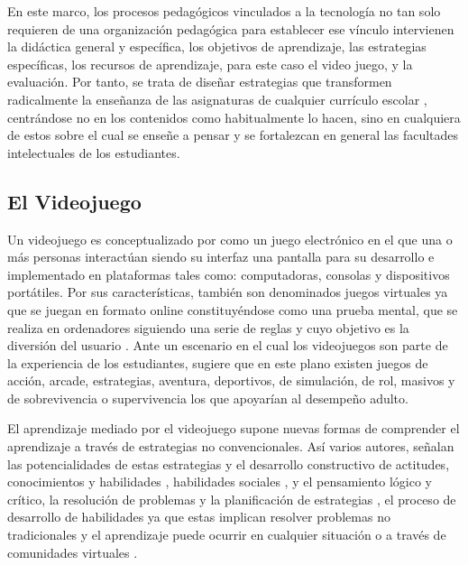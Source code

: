 \documentclass[spanish]{textolivre}
\begin{document}
En este marco, los procesos pedagógicos vinculados a la tecnología no tan solo requieren de una organización pedagógica para establecer ese vínculo intervienen la didáctica general y específica, los objetivos de aprendizaje, las estrategias específicas, los recursos de aprendizaje, para este caso el video juego, y la evaluación. Por tanto, se trata de diseñar estrategias que transformen radicalmente la enseñanza de las asignaturas de cualquier currículo escolar \cite{maclure2003}, 
centrándose no en los contenidos como habitualmente lo hacen, sino en cualquiera de estos sobre el cual se enseñe a pensar y se fortalezcan en general las facultades intelectuales de los estudiantes.

\subsection{El Videojuego}\label{elvideo}

Un videojuego es conceptualizado por \textcite{riveraarteaga2018} %
como un juego electrónico en el que una o más personas interactúan siendo su interfaz una pantalla para su desarrollo e implementado en plataformas tales como: computadoras, consolas y dispositivos portátiles. Por sus características, también son denominados juegos virtuales ya que se juegan en formato online \cite{lacasa2011} %
constituyéndose como una prueba mental, que se realiza en ordenadores siguiendo una serie de reglas y cuyo objetivo es la diversión del usuario \cite{zyda2005}. %
Ante un escenario en el cual los videojuegos son parte de la experiencia de los estudiantes, \textcite{sedeno2010} %
sugiere que en este plano existen juegos de acción, arcade, estrategias, aventura, deportivos, de simulación, de rol, masivos y de sobrevivencia o supervivencia los que apoyarían al desempeño adulto.

El aprendizaje mediado por el videojuego supone nuevas formas de comprender el aprendizaje a través de estrategias no convencionales. Así varios autores, señalan las potencialidades de estas estrategias y el desarrollo constructivo de actitudes, conocimientos y habilidades \cite{eguia2013}, %
habilidades sociales \cite{dondi2014}, %
y el pensamiento lógico y crítico, la resolución de problemas y la planificación de estrategias \cite{kirriemuir2004, riveraarteaga2018}, %
el proceso de desarrollo de habilidades ya que estas implican resolver problemas no tradicionales y el aprendizaje puede ocurrir en cualquier situación o a través de comunidades virtuales \cite{lacasa2011}. %
\end{document}
